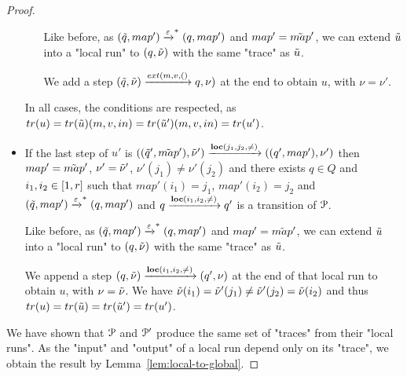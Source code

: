 \begin{proof}
\begin{itemize}
\begin{itemize}
			Like before, as $(\Tilde{q}, map') \xrightarrow{\varepsilon}^* (q, map')$ and $map'=\Tilde{map}'$, we can extend $\Tilde{u}$ into a "local run" to $(q, \Tilde{\nu})$ with the same "trace" as $\Tilde{u}$.
			
			We add a step $(\Tilde{q}, \Tilde{\nu}) \extbr{m,v} (q, \nu)$ at the end to obtain $u$, with $\nu = \nu'$.
		\end{itemize}
		
		In all cases, the conditions are respected, as $\trace{u} = \trace{\Tilde{u}} (m,v, in) = \trace{\Tilde{u}'} (m,v, in) = \trace{u'}$.
		
		\item If the last step of $u'$ is $((\Tilde{q}', \Tilde{map}'), \Tilde{\nu}') \xrightarrow{\textbf{loc}(j_1,j_2,{\ne})} ((q', map'), \nu')$ then $map'=\Tilde{map}'$, $\nu' = \Tilde{\nu}'$, $\nu'(j_1) \neq \nu'(j_2)$ and there exists $q \in Q$ and $i_1, i_2 \in [1,r]$ such that $map'(i_1)=j_1$, $map'(i_2)=j_2$ and $(\Tilde{q}, map') \xrightarrow{\varepsilon}^* (q, map')$ and $q \xrightarrow{\textbf{loc}(i_1,i_2,{\ne})} q'$ is a transition of $\mathcal{P}$.
		
		Like before, as $(\Tilde{q}, map') \xrightarrow{\varepsilon}^* (q, map')$ and $map'=\Tilde{map}'$, we can extend $\Tilde{u}$ into a "local run" to $(q, \Tilde{\nu})$ with the same "trace" as $\Tilde{u}$.
		
		
		We append a step $(q, \Tilde{\nu}) \xrightarrow{\textbf{loc}(i_1,i_2,{\ne})} (q', \nu)$ at the end of that local run to obtain $u$, with $\nu = \Tilde{\nu}$. We have $\Tilde{\nu}(i_1) = \Tilde{\nu}'(j_1) \neq \Tilde{\nu}'(j_2) = \Tilde{\nu}(i_2)$ and thus $\trace{u} = \trace{\Tilde{u}} = \trace{\Tilde{u}'} = \trace{u'}$.
	\end{itemize}
	
	We have shown that $\mathcal{P}$ and $\mathcal{P}'$ produce the same set of "traces" from their "local runs". As the "input" and "output" of a local run depend only on its "trace", we obtain the result by Lemma~\ref{lem:local-to-global}.
\end{proof}
